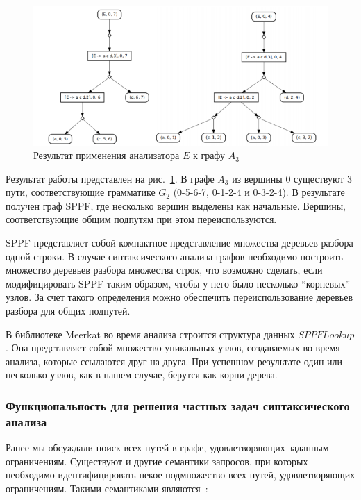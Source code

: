 \begin{figure}
 \centering
 \includegraphics[width=\textwidth]{Smolina/pics/Trees2.png}
 \caption{Результат применения анализатора $E$ к графу $A_3$}
 \label{Trees2}
\end{figure}

Результат работы представлен на рис.~\ref{Trees2}. В графе $A_3$ из вершины 0 существуют 3 пути, соответствующие грамматике $G_2$ (0-5-6-7, 0-1-2-4 и 0-3-2-4). В результате получен граф SPPF, где несколько вершин выделены как начальные. Вершины, соответствующие общим подпутям при этом переиспользуются.

SPPF представляет собой компактное представление множества деревьев разбора одной строки. В случае синтаксического анализа графов необходимо построить множество деревьев разбора множества строк, что возможно сделать, если модифицировать SPPF таким образом, чтобы у него было несколько ``корневых'' узлов. За счет такого определения можно обеспечить переиспользование деревьев разбора для общих подпутей.

В библиотеке Meerkat во время анализа строится структура данных $SPPFLookup$. Она представляет собой множество уникальных узлов, создаваемых во время анализа, которые ссылаются друг на друга. При успешном результате один или несколько узлов, как в нашем случае, берутся как корни дерева.

\subsubsection{Функциональность для решения частных задач синтаксического анализа}

Ранее мы обсуждали поиск всех путей в графе, удовлетворяющих заданным ограничениям. Существуют и другие семантики запросов, при которых необходимо идентифицировать некое подмножество всех путей, удовлетворяющих ограничениям. Такими семантиками являются~\cite{Hellings}:

